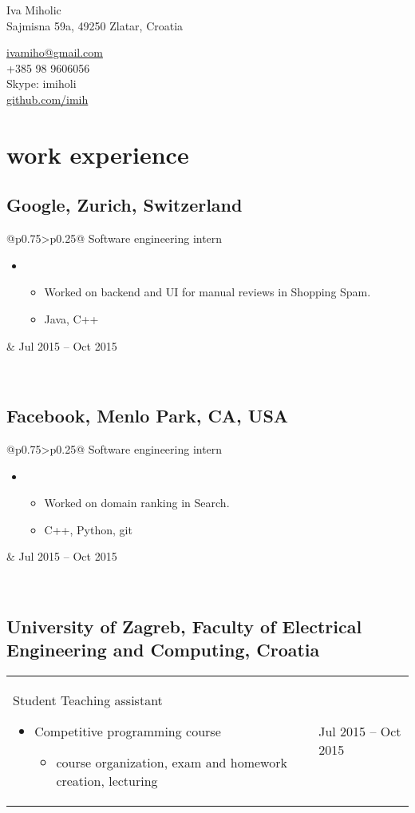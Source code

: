 \documentclass[a4paper]{article}
\makeatletter
\newlength{\tablewidth}
\newenvironment{period}[2]{%
\newcommand{\sarma}{#2}%
\setlength{\tablewidth}{\linewidth}
\addtolength{\tablewidth}{-2\tabcolsep}
\begin{tabular}{@{}p{0.75\tablewidth}>{\raggedleft\arraybackslash}p{0.25\tablewidth}@{}}%
#1 \newline
\begin{itemize}
}{%
\end{itemize} & \sarma \\%
\end{tabular}\\
}
\makeatother
\begin{document}
\fontfamily{\sfdefault}
\selectfont

\begin{minipage}{.5\textwidth}
\LARGE{Iva Miholic}\\
\normalsize{Sajmisna 59a, 49250 Zlatar, Croatia}
\end{minipage}%
\begin{minipage}{.5\textwidth}
\raggedleft
\href{mailto:ivamiho@gmail.com}{ivamiho@gmail.com}  \\
+385 98 9606056 \\
Skype: imiholi \\
\href{https://github.com/imih}{github.com/imih}
\end{minipage}

\vspace{1em}

\thinspace
\section{work experience}
\subsection{Google, Zurich, Switzerland}
\begin{period}{Software engineering intern}{Jul 2015 -- Oct 2015}
    \item
        \begin{itemize}
           \item Worked on backend and UI for manual reviews in Shopping Spam.
            \item Java, C++
        \end{itemize}
\end{period}
\subsection{Facebook, Menlo Park, CA, USA}
\begin{period}{Software engineering intern}{Jul 2014 -- Oct 2014}
    \item
        \begin{itemize}
        \item Worked on domain ranking in Search.
            \item C++, Python, git
        \end{itemize}
\end{period}
\subsection{University of Zagreb, Faculty of Electrical Engineering and Computing, Croatia}
\begin{period}{Student Teaching assistant}{Oct 2013 -}
    \item Competitive programming course
     \begin{itemize}
     \item{course organization, exam and homework creation, lecturing}
     \end{itemize}
\end{period}
\end{document}
